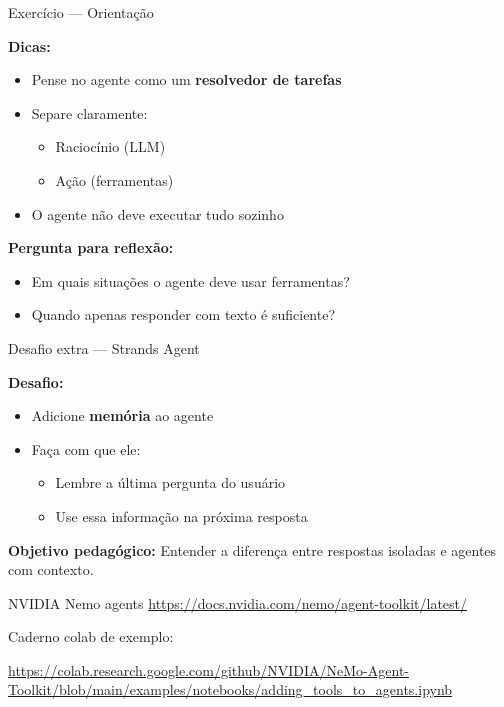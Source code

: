 \documentclass{beamer}
\begin{document}
\begin{frame}{Exercício — Orientação}
    
    \textbf{Dicas:}
    \begin{itemize}
        \item Pense no agente como um \textbf{resolvedor de tarefas}
        \item Separe claramente:
        \begin{itemize}
            \item Raciocínio (LLM)
            \item Ação (ferramentas)
        \end{itemize}
        \item O agente não deve executar tudo sozinho
    \end{itemize}
    
    \vspace{0.3cm}
    
    \textbf{Pergunta para reflexão:}
    \begin{itemize}
        \item Em quais situações o agente deve usar ferramentas?
        \item Quando apenas responder com texto é suficiente?
    \end{itemize}
    
\end{frame}

\begin{frame}{Desafio extra — Strands Agent}
    
    \textbf{Desafio:}
    \begin{itemize}
        \item Adicione \textbf{memória} ao agente
        \item Faça com que ele:
        \begin{itemize}
            \item Lembre a última pergunta do usuário
            \item Use essa informação na próxima resposta
        \end{itemize}
    \end{itemize}
    
    \vspace{0.3cm}
    
    \textbf{Objetivo pedagógico:}  
    Entender a diferença entre respostas isoladas e agentes com contexto.
    
\end{frame}

\begin{frame}{NVIDIA Nemo agents}
\url{https://docs.nvidia.com/nemo/agent-toolkit/latest/}

Caderno colab de exemplo:

\url{https://colab.research.google.com/github/NVIDIA/NeMo-Agent-Toolkit/blob/main/examples/notebooks/adding_tools_to_agents.ipynb}
\end{frame}
\end{document}
